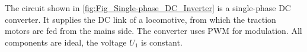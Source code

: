 
The circuit shown in \autoref{fig:Fig_Single-phase_DC_Inverter} is a single-phase DC converter.
It supplies the DC link of a locomotive, from which the traction motors are fed from the mains side. The converter uses PWM for modulation. All components are ideal, the voltage $U_\mathrm{1}$ is constant.

